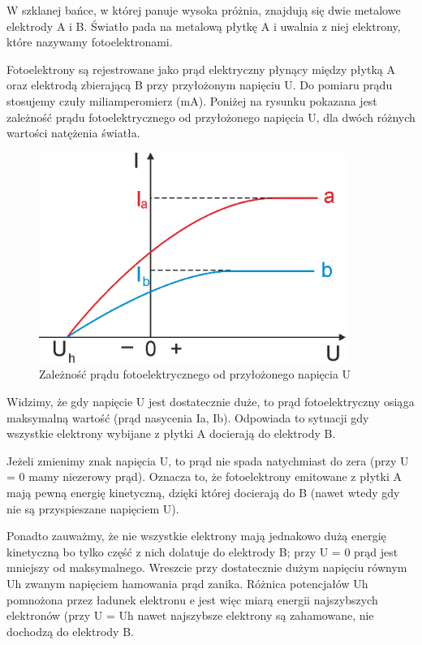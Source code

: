 \documentclass[12pt, a4paper, notitlepage]{report}
\begin{document}
	W szklanej bańce, w której panuje wysoka próżnia, znajdują się dwie metalowe elektrody
	A i B. Światło pada na metalową płytkę A i uwalnia z niej elektrony, które nazywamy
	fotoelektronami.

	Fotoelektrony są rejestrowane jako prąd elektryczny płynący między płytką A oraz
	elektrodą zbierającą B przy przyłożonym napięciu U. Do pomiaru prądu stosujemy
	czuły miliamperomierz (mA). Poniżej na rysunku pokazana jest zależność prądu fotoelektrycznego
	od przyłożonego napięcia U, dla dwóch różnych wartości natężenia światła.

	\begin{figure}[htp]
		\centering
		\includegraphics[width=10cm]{img/rysunek_1.2.png}
		\caption{Zależność prądu fotoelektrycznego od przyłożonego napięcia U}
		\label{fig:2}
	\end{figure}

	Widzimy, że gdy napięcie U jest dostatecznie duże, to prąd fotoelektryczny osiąga
	maksymalną wartość (prąd nasycenia Ia, Ib). Odpowiada to sytuacji gdy wszystkie
	elektrony wybijane z płytki A docierają do elektrody B.

	Jeżeli zmienimy znak napięcia U, to prąd nie spada natychmiast do zera (przy U
	= 0 mamy niezerowy prąd). Oznacza to, że fotoelektrony emitowane z płytki A
	mają pewną energię kinetyczną, dzięki której docierają do B (nawet wtedy gdy
	nie są przyspieszane napięciem U).

	Ponadto zauważmy, że nie wszystkie elektrony mają jednakowo dużą energię
	kinetyczną bo tylko część z nich dolatuje do elektrody B; przy U = 0 prąd jest
	mniejszy od maksymalnego. Wreszcie przy dostatecznie dużym napięciu równym Uh
	zwanym napięciem hamowania prąd zanika. Różnica potencjałów Uh pomnożona przez
	ładunek elektronu e jest więc miarą energii najszybszych elektronów (przy U =
	Uh nawet najszybsze elektrony są zahamowane, nie dochodzą do elektrody B.
\end{document}
